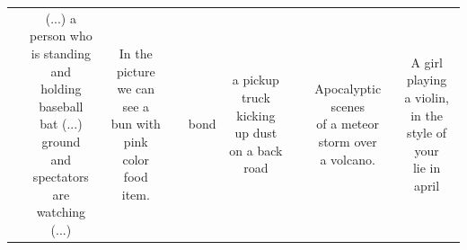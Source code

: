 \begin{table}[hbp]
{\begin{tabular}{ccccccccc}
                                                                                                    & \makecell{(...) a person who                                                                                                                                                                                                                                                                                                                                                                                                                                                                                                                                                                                                        \\is standing and\\holding baseball\\bat (...) ground\\and spectators\\are watching (...)} &\makecell{In the picture\\we can see a\\bun with pink\\color food item.}& \phantom{0}& bond & \makecell{a pickup truck\\kicking up dust\\on a back road} & \phantom{0} & \makecell{Apocalyptic scenes\\of a meteor\\storm over\\a volcano.} & \makecell{A girl playing\\a violin, in the\\style of your\\lie in april} \\

\end{tabular}}
\end{table}

